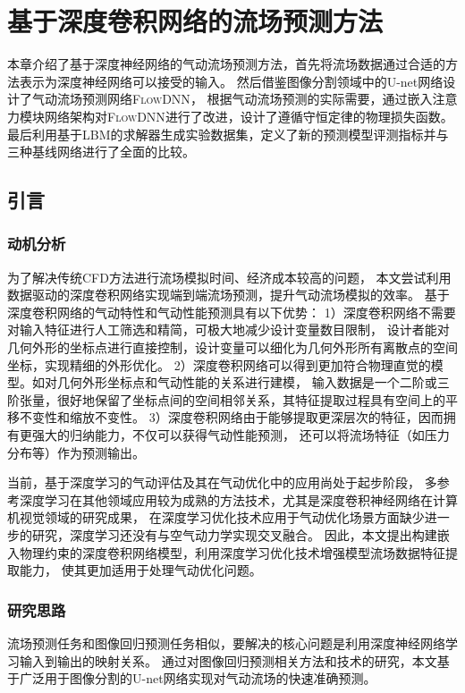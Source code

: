 \chapter{基于深度卷积网络的流场预测方法}

本章介绍了基于深度神经网络的气动流场预测方法，首先将流场数据通过合适的方法表示为深度神经网络可以接受的输入。
然后借鉴图像分割领域中的U-net网络设计了气动流场预测网络\textsc{FlowDNN}，
根据气动流场预测的实际需要，通过嵌入注意力模块网络架构对\textsc{FlowDNN}进行了改进，设计了遵循守恒定律的物理损失函数。
最后利用基于LBM的求解器生成实验数据集，定义了新的预测模型评测指标并与三种基线网络进行了全面的比较。


\section{引言}

\subsection{动机分析}

为了解决传统CFD方法进行流场模拟时间、经济成本较高的问题，
本文尝试利用数据驱动的深度卷积网络实现端到端流场预测，提升气动流场模拟的效率。
基于深度卷积网络的气动特性和气动性能预测具有以下优势：
1）深度卷积网络不需要对输入特征进行人工筛选和精简，可极大地减少设计变量数目限制，
设计者能对几何外形的坐标点进行直接控制，设计变量可以细化为几何外形所有离散点的空间坐标，实现精细的外形优化。
2）深度卷积网络可以得到更加符合物理直觉的模型。如对几何外形坐标点和气动性能的关系进行建模，
输入数据是一个二阶或三阶张量，很好地保留了坐标点间的空间相邻关系，其特征提取过程具有空间上的平移不变性和缩放不变性。
3）深度卷积网络由于能够提取更深层次的特征，因而拥有更强大的归纳能力，不仅可以获得气动性能预测，
还可以将流场特征（如压力分布等）作为预测输出。

当前，基于深度学习的气动评估及其在气动优化中的应用尚处于起步阶段，
多参考深度学习在其他领域应用较为成熟的方法技术，尤其是深度卷积神经网络在计算机视觉领域的研究成果，
在深度学习优化技术应用于气动优化场景方面缺少进一步的研究，深度学习还没有与空气动力学实现交叉融合。
因此，本文提出构建嵌入物理约束的深度卷积网络模型，利用深度学习优化技术增强模型流场数据特征提取能力，
使其更加适用于处理气动优化问题。


\subsection{研究思路}
流场预测任务和图像回归预测任务相似，要解决的核心问题是利用深度神经网络学习输入到输出的映射关系。
通过对图像回归预测相关方法和技术的研究，本文基于广泛用于图像分割的U-net网络实现对气动流场的快速准确预测。

